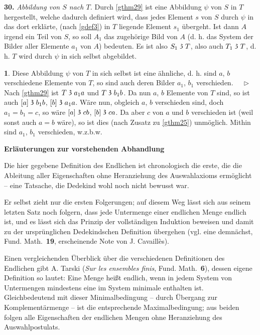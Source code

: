 \documentclass[leqno,hidelinks]{article}
\theoremstyle{definition}
\newtheorem{satz}{\protect\satzname}
\newcommand{\satzname}{}
\renewcommand{\satzname}{\hspace{-4pt}.\ Satz}%
\renewcommand{\satzname}{\hspace{-4pt}.\ Theorem}%
\newcommand\Beweis{\medskip \newline $ \phantom{'.'} \rhd \ $}%
\newcommand\TeilVon{\mathrel{\raisebox{0.45ex}{$\mathfrak{3}$}}}
\newcommand{\sref}[1]{\underline{\ref{#1}}}%
\begin{document}
\begin{paracol}{2}
\noindent \textbf{30.}\label{gthm30} \emph{Abbildung von $S$ nach $T$.}
Durch \sref{gthm29} ist eine Abbildung $\psi$ von $S$ in $T$ hergestellt, welche
dadurch definiert wird, dass jedes Element $s$ von $S$ durch $\psi$ in das dort
erklärte, (nach \sref{gdef3}) in $T$ liegende Element $s_1$ übergeht. Ist dann
$A$ irgend ein Teil von $S$, so soll $A_1$ das zugehörige Bild von $A$ (d. h.
das System der Bilder aller Elemente $a_1$ von $A$) bedeuten. Es ist also
$S_1 \TeilVon T$, also auch $T_1 \TeilVon T$, d. h. $T$ wird durch $\psi$ in sich
selbst abgebildet.

\begin{satz}\label{gthm31}
Diese Abbildung $\psi$ von $T$ in sich selbst ist eine ähnliche, d. h. sind $a$, $b$
verschiedene Elemente von $T$, so sind auch deren Bilder $a_1$, $b_1$ verschieden.
\Beweis
Nach \sref{gthm29} ist $T \TeilVon a_1a$ und $T \TeilVon b_1b$. Da nun $a$, $b$
Elemente von $T$ sind, so ist auch $[a] \TeilVon b_1b$, $[b] \TeilVon a_1a$. Wäre
nun, obgleich $a$, $b$ verschieden sind, doch $a_1 = b_1 = c$, so wäre
$[a] \TeilVon cb$, $[b] \TeilVon ca$. Da aber $c$ von $a$ und $b$ verschieden
ist (weil sonst auch $a = b$ wäre), so ist dies (nach Zusatz zu \sref{gthm25})
unmöglich. Mithin sind $a_1$, $b_1$ verschieden, w.z.b.w.
\end{satz}

\newpage

\hspace{64pt}

\begin{center}\Large\textbf{Erläuterungen zur vorstehenden Abhandlung}
\end{center}

\bigskip

Die hier gegebene Definition des Endlichen ist chronologisch die erste, die die
Ableitung aller Eigenschaften ohne Heranziehung des Auswahlaxioms ermöglicht --
eine Tatsache, die Dedekind wohl noch nicht bewusst war.

Er selbst zieht nur die ersten Folgerungen; auf diesem Weg lässt sich aus seinem
letzten Satz noch folgern, dass jede Untermenge einer endlichen Menge endlich ist,
und es lässt sich das Prinzip der vollständigen Induktion beweisen und damit zu
der ursprünglichen Dedekindschen Definition übergehen (vgl. eine demnächst, Fund.
Math.\ \textbf{19}, erscheinende Note von J. Cavaillès).

Einen vergleichenden Überblick über die verschiedenen Definitionen des Endlichen
gibt A. Tarski (\emph{Sur les ensembles finis}, Fund. Math.\ \textbf{6}), dessen
eigene Definition so lautet: Eine Menge heißt endlich, wenn in jedem System von
Untermengen mindestens eine im System minimale enthalten ist. Gleichbedeutend mit
dieser Minimalbedingung -- durch Übergang zur Komplementärmenge -- ist die
entsprechende Maximalbedingung; aus beiden folgen alle Eigenschaften der endlichen
Mengen ohne Heranziehung des Auswahlpostulats.


\end{paracol}
\end{document}
